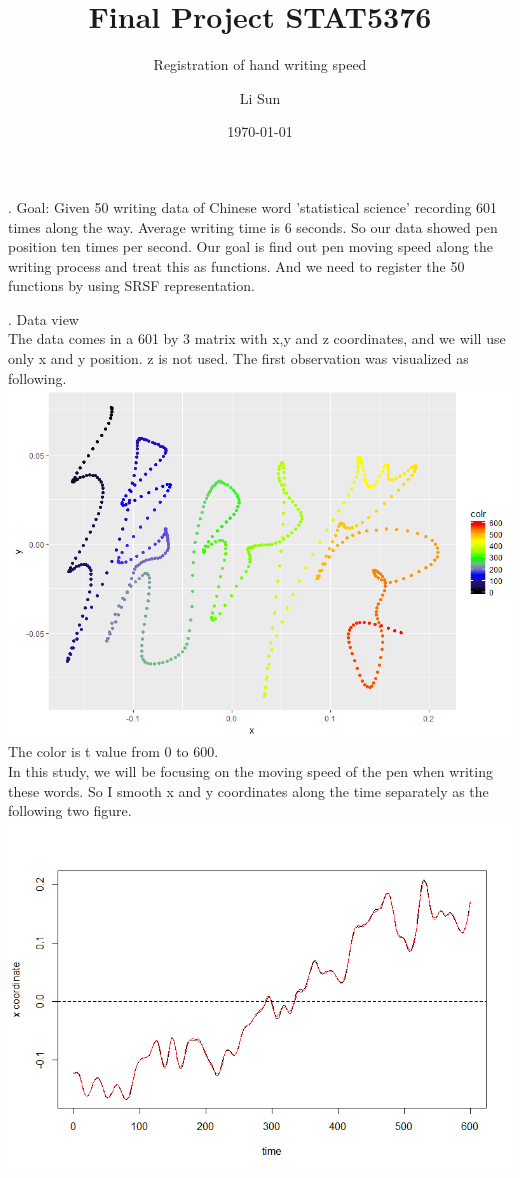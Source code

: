 \documentclass[11pt]{scrartcl}
\begin{document}
\title{Final Project STAT5376}
\subtitle{Registration of hand writing speed}
\author{Li Sun}
\date{\today}
\maketitle

. Goal: Given 50 writing data of Chinese word 'statistical science' recording 601 times along the way. Average writing time is 6 seconds. So our data showed pen position ten times per second. Our goal is find out pen moving speed along the writing process and treat this as functions. And we need to register the 50 functions by using SRSF representation. 

\bigskip

. Data view\\
The data comes in a 601 by 3 matrix with x,y and z coordinates, and we will use only x and y position. z is not used. The first observation was visualized as following.\\
\includegraphics[scale=0.7]{fp00.png}\\
The color is t value from 0 to 600.\\
In this study, we will be focusing on the moving speed of the pen when writing these words. So I smooth x and y coordinates along the time separately as the following two figure.\\
\includegraphics[scale=0.7]{fp01.png}\\
\end{document}
